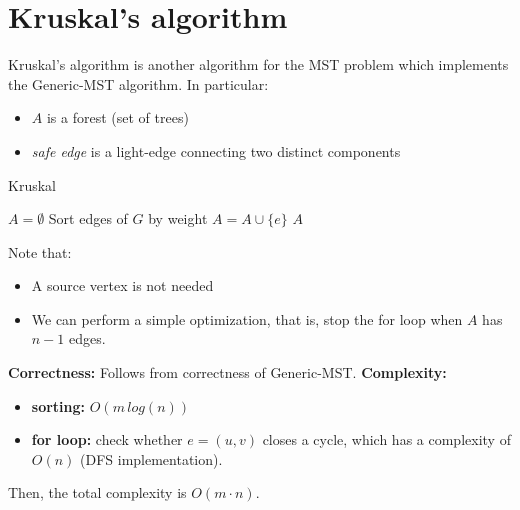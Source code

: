\section{Kruskal's algorithm}
Kruskal's algorithm is another algorithm for the MST problem which implements the Generic-MST algorithm. In particular:
\begin{itemize}
    \item $A$ is a forest (set of trees)
    \item \textit{safe edge} is a light-edge connecting two distinct components
\end{itemize}
\begin{algorithm}
\caption{Kruskal}\label{kruskal}
    \begin{algorithmic}[1]
        \State $A = \emptyset$
        \State Sort edges of $G$ by weight
                \State $A = A \cup \{e\}$
            \EndIf
        \EndFor
        \Return $A$
    \EndProcedure
    \end{algorithmic}
\end{algorithm}
Note that:
\begin{itemize}
    \item A source vertex is not needed
    \item We can perform a simple optimization, that is, stop the for loop when $A$ has $n-1$ edges.
\end{itemize}
\textbf{Correctness:} Follows from correctness of Generic-MST.\newline\newline
\textbf{Complexity:}
\begin{itemize}
    \item \textbf{sorting:} $O(m\,log(n))$
    \item \textbf{for loop:} check whether $e = (u,v)$ closes a cycle, which has a complexity of $O(n)$ (DFS implementation). 
\end{itemize}
Then, the total complexity is $O(m \cdot n)$.

